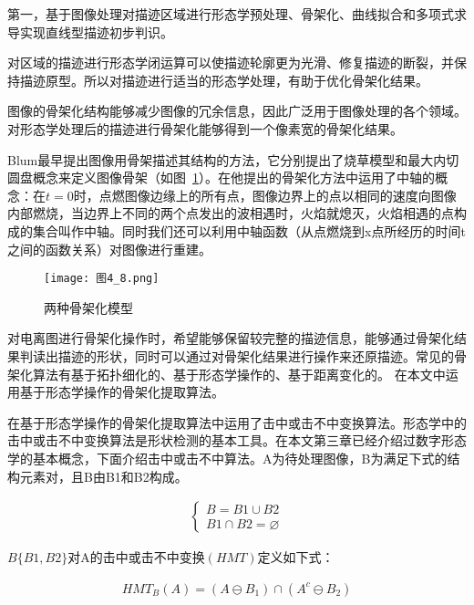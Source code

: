 第一，基于图像处理对描迹区域进行形态学预处理、骨架化、曲线拟合和多项式求导实现直线型描迹初步判识。

对区域的描迹进行形态学闭运算可以使描迹轮廓更为光滑、修复描迹的断裂，并保持描迹原型。所以对描迹进行适当的形态学处理，有助于优化骨架化结果。

图像的骨架化结构能够减少图像的冗余信息，因此广泛用于图像处理的各个领域。对形态学处理后的描迹进行骨架化能够得到一个像素宽的骨架化结果。

Blum最早提出图像用骨架描述其结构的方法，它分别提出了烧草模型和最大内切圆盘\cite{blura1973biological}概念来定义图像骨架（如图~\ref{图4_8}）。在他提出的骨架化方法中运用了中轴的概念：在$t=0$时，点燃图像边缘上的所有点，图像边界上的点以相同的速度向图像内部燃烧，当边界上不同的两个点发出的波相遇时，火焰就熄灭，火焰相遇的点构成的集合叫作中轴。同时我们还可以利用中轴函数（从点燃烧到x点所经历的时间t之间的函数关系）对图像进行重建。

\begin{figure}[!ht]
\centering
\texttt{[image: 图4\_8.png]}
\caption{两种骨架化模型}
\label{图4_8}
\end{figure}


对电离图进行骨架化操作时，希望能够保留较完整的描迹信息，能够通过骨架化结果判读出描迹的形状，同时可以通过对骨架化结果进行操作来还原描迹。常见的骨架化算法有基于拓扑细化的、基于形态学操作的、基于距离变化的\cite{廖志武20092}\cite{陈晓飞2004基于骨架的目标表示和识别技术研究}。 在本文中运用基于形态学操作的骨架化提取算法。

在基于形态学操作的骨架化提取算法中运用了击中或击不中变换算法。形态学中的击中或击不中变换算法是形状检测的基本工具。在本文第三章已经介绍过数字形态学的基本概念，下面介绍击中或击不中算法。A为待处理图像，B为满足下式的结构元素对，且B由B1和B2构成。
\begin{linenomath}
\begin{align}
\left \{
\begin{aligned}
B=B1 \cup B2\\
B1 \cap B2=\varnothing
\end{aligned} 
\right.
\label{式4_20}
\end{align}
\end{linenomath}

$B\{B1,B2\}$对A的击中或击不中变换$(HMT)$定义如下式：
\begin{linenomath}
\begin{align}
 {HMT}_{B}(A)=(A \ominus B_{1})\cap(A^{c} \ominus B_{2})
\label{式4_21}
\end{align}
\end{linenomath}


